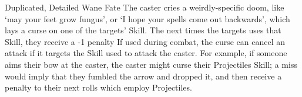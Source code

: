   {Duplicated, Detailed}%
  {Wane}%
  {Fate}%
  {}%
  {The caster cries a weirdly-specific doom, like `may your feet grow fungus', or `I hope your spells come out backwards', which lays a curse on one of the targets' Skill.
  The next  times the targets uses that Skill, they receive a -1 penalty}%
  {If used during combat, the curse can cancel an attack if it targets the Skill used to attack the caster.
  For example, if someone aims their bow at the caster, the caster might curse their Projectiles Skill; a miss would imply that they fumbled the arrow and dropped it, and then receive a penalty to their next  rolls which employ Projectiles.}
